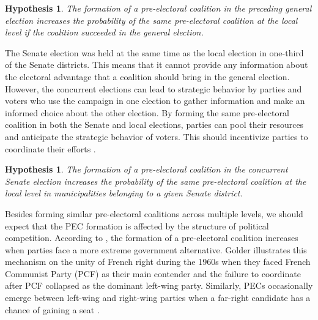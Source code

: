 \documentclass[fignum,12pt,titlepage]{article}
\newtheorem{hypo}{Hypothesis}
\newtheorem{subhypo}{Hypothesis}
\begin{document}
\begin{subhypo}
{The formation of a pre-electoral coalition in the preceding general election increases the probability of the same pre-electoral coalition at the local level if the coalition succeeded in the general election.\label{hyp:1.1}}
\end{subhypo}





The Senate election was held at the same time as the local election in one-third of the Senate districts. This means that it cannot provide any information about the electoral advantage that a coalition should bring in the general election. However, the concurrent elections can lead to strategic behavior by parties and voters who use the campaign in one election to gather information and make an informed choice about the other election. By forming the same pre-electoral coalition in both the Senate and local elections, parties can pool their resources and anticipate the strategic behavior of voters. This should incentivize parties to coordinate their efforts \parencite{hicken2011}. 

\begin{hypo}
{The formation of a pre-electoral coalition in the concurrent Senate election increases the probability of the same pre-electoral coalition at the local level in municipalities belonging to a given Senate district.\label{hyp:2}}
\end{hypo}

Besides forming similar pre-electoral coalitions across multiple levels, we should expect that the PEC formation is affected by the structure of political competition. 
According to \textcite{golder2006}, the formation of a pre-electoral coalition increases when parties face a more extreme government alternative. Golder illustrates this mechanism on the unity of French right during the 1960s when they faced French Communist Party (PCF) as their main contender and the failure to coordinate after PCF collapsed as the dominant left-wing party. Similarly, PECs occasionally emerge between left-wing and right-wing parties when a far-right candidate has a chance of gaining a seat \parencite[73]{golder2006}. 
\end{document}

